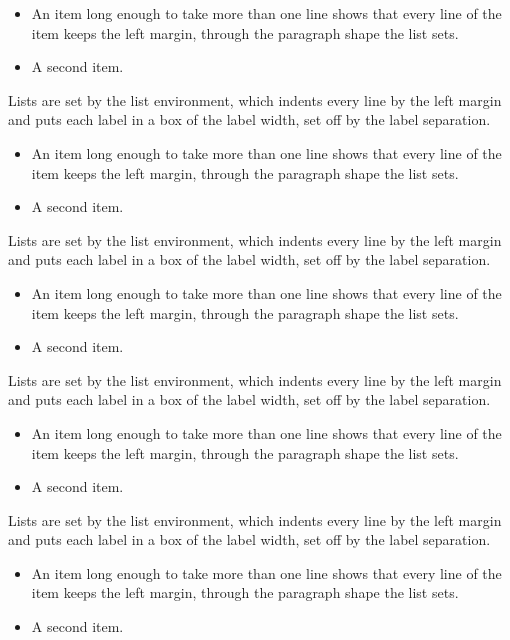 \documentclass[12pt]{book}
\begin{document}
\begin{itemize}
\item An item long enough to take more than one line shows that every line of the item keeps the left margin, through the paragraph shape the list sets.
\item A second item.
\end{itemize}

Lists are set by the list environment, which indents every line by the left margin and puts each label in a box of the label width, set off by the label separation.

\begin{itemize}
\item An item long enough to take more than one line shows that every line of the item keeps the left margin, through the paragraph shape the list sets.
\item A second item.
\end{itemize}

Lists are set by the list environment, which indents every line by the left margin and puts each label in a box of the label width, set off by the label separation.

\begin{itemize}
\item An item long enough to take more than one line shows that every line of the item keeps the left margin, through the paragraph shape the list sets.
\item A second item.
\end{itemize}

Lists are set by the list environment, which indents every line by the left margin and puts each label in a box of the label width, set off by the label separation.

\begin{itemize}
\item An item long enough to take more than one line shows that every line of the item keeps the left margin, through the paragraph shape the list sets.
\item A second item.
\end{itemize}

Lists are set by the list environment, which indents every line by the left margin and puts each label in a box of the label width, set off by the label separation.

\begin{itemize}
\item An item long enough to take more than one line shows that every line of the item keeps the left margin, through the paragraph shape the list sets.
\item A second item.
\end{itemize}
\end{document}
